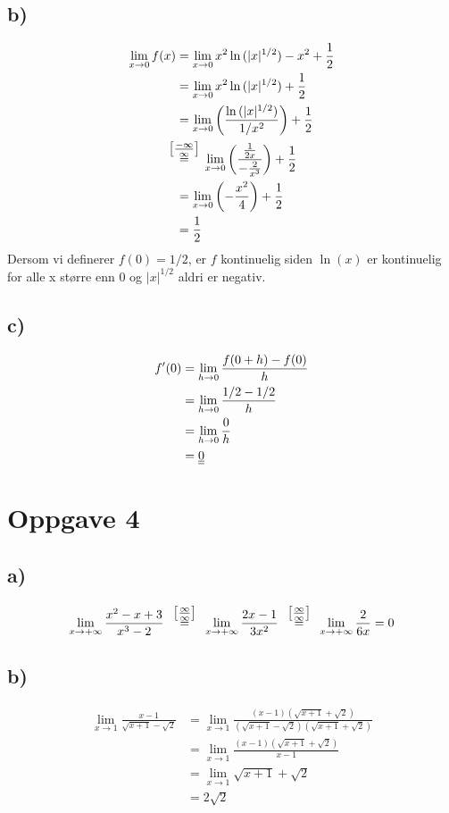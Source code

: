 \documentclass{article}
\begin{document}
\subsection*{b)}
\begin{align*}
	\lim_{x\to 0} f(x) &= \lim_{x\to 0} x^2\ln{(|x|^{1/2})} - x^2 + \frac{1}{2}\\
	&= \lim_{x\to 0} x^2\ln{(|x|^{1/2})} + \frac{1}{2}\\
	&= \lim_{x\to 0} \left(\frac{\ln{(|x|^{1/2})}}{1/x^2}\right) + \frac{1}{2}\\
&\neginfinf \quad \lim_{x\to 0} \left( \frac{\frac{1}{2x}}{-\frac{2}{x^3}} \right)+\frac{1}{2}\\
	&=\lim_{x\to 0} \left(-\frac{x^2}{4}\right) +\frac{1}{2}\\
	&= \frac{1}{2}
\end{align*}
Dersom vi definerer $f(0)=1/2$, er $f$ kontinuelig siden $\ln(x)$ er kontinuelig for alle x større enn 0 og $|x|^{1/2}$  aldri er negativ.

\subsection*{c)}

\begin{align*}
f'(0) &= \lim_{h\to 0}\frac{f(0 + h) - f(0)}{h}\\
&= \lim_{h\to 0} \frac{1/2 - 1/2}{h}\\
&= \lim_{h\to 0} \frac{0}{h}\\
&=\underline{\underline{0}}
\end{align*}


\section*{Oppgave 4}
\subsection*{a)}
\begin{align*}
	\lim_{x\to +\infty} \frac{x^2-x+3}{x^3 - 2}\quad \infinf\quad \lim_{x\to +\infty} \frac{2x-1}{3x^2}
	\quad\infinf\quad \lim_{x\to +\infty} \frac{2}{6x}
	= 0
\end{align*}
\subsection*{b)}
\begin{align*}
	\lim_{x\to 1} \frac{x-1}{\sqrt{x+1} - \sqrt{2}} &= \lim_{x\to 1} \frac{(x-1)(\sqrt{x+1} + \sqrt{2})}{(\sqrt{x+1} - \sqrt{2})(\sqrt{x+1} + \sqrt{2})}\\
	&= \lim_{x\to 1} \frac{(x-1)(\sqrt{x+1} + \sqrt{2})}{x-1}\\
	&= \lim_{x\to 1} \sqrt{x+1} + \sqrt{2}\\
	&= 2\sqrt{2}
\end{align*}
\end{document}
